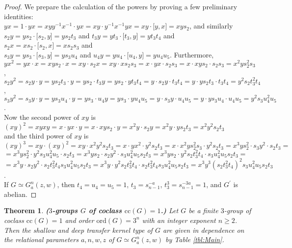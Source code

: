 \documentclass{amsart}
\newtheorem{theorem}{Theorem}[section]
\theoremstyle{definition}
\numberwithin{equation}{section}
\begin{document}
\begin{proof}
We prepare the calculation of the powers by proving a few preliminary identities:\\
\(yx=1\cdot yx=xyy^{-1}x^{-1}\cdot yx=xy\cdot y^{-1}x^{-1}yx=xy\cdot\lbrack y,x\rbrack=xys_2\), and similarly\\
\(s_2y=ys_2\cdot\lbrack s_2,y\rbrack=ys_2t_3\) and
\(t_3y=yt_3\cdot\lbrack t_3,y\rbrack=yt_3t_4\) and
\(s_2x=xs_2\cdot\lbrack s_2,x\rbrack=xs_2s_3\) and\\
\(s_3y=ys_3\cdot\lbrack s_3,y\rbrack=ys_3u_4\) and
\(u_4y=yu_4\cdot\lbrack u_4,y\rbrack=yu_4u_5\). Furthermore,\\
\(yx^2=yx\cdot x=xys_2\cdot x=xy\cdot s_2x=xy\cdot xs_2s_3=x\cdot yx\cdot s_2s_3=x\cdot xys_2\cdot s_2s_3=x^2ys_2^2s_3\),\\
\(s_2y^2=s_2y\cdot y=ys_2t_3\cdot y=ys_2\cdot t_3y=ys_2\cdot yt_3t_4=y\cdot s_2y\cdot t_3t_4=y\cdot ys_2t_3\cdot t_3t_4=y^2s_2t_3^2t_4\),\\
\(s_3y^2=s_3y\cdot y=ys_3u_4\cdot y=ys_3\cdot u_4y=ys_3\cdot yu_4u_5=y\cdot s_3y\cdot u_4u_5=y\cdot ys_3u_4\cdot u_4u_5=y^2s_3u_4^2u_5\).\\
Now the second power of \(xy\) is\\
\((xy)^2=xyxy=x\cdot yx\cdot y=x\cdot xys_2\cdot y=x^2y\cdot s_2y=x^2y\cdot ys_2t_3=x^2y^2s_2t_3\)\\
and the third power of \(xy\) is\\
\((xy)^3=xy\cdot (xy)^2=xy\cdot x^2y^2s_2t_3=x\cdot yx^2\cdot y^2s_2t_3=x\cdot x^2ys_2^2s_3\cdot y^2s_2t_3=x^3ys_2^2\cdot s_3y^2\cdot s_2t_3=\)\\
\(=x^3ys_2^2\cdot y^2s_3u_4^2u_5\cdot s_2t_3=x^3ys_2\cdot s_2y^2\cdot s_3u_4^2u_5s_2t_3=x^3ys_2\cdot y^2s_2t_3^2t_4\cdot s_3u_4^2u_5s_2t_3=\)\\
\(=x^3y\cdot s_2y^2\cdot s_2t_3^2t_4s_3u_4^2u_5s_2t_3=x^3y\cdot y^2s_2t_3^2t_4\cdot s_2t_3^2t_4s_3u_4^2u_5s_2t_3=x^3y^3(s_2t_3^2t_4)^2s_3u_4^2u_5s_2t_3\).\\
If \(G\simeq G_a^n(z,w)\), then \(t_4=u_4=u_5=1\), \(t_3=s_{n-1}^{-a}\), \(t_3^3=s_{n-1}^{-3a}=1\), and \(G^\prime\) is abelian.
\end{proof}


\begin{theorem}
\label{thm:Main}
\textbf{(\(3\)-groups \(G\) of coclass \(\mathrm{cc}(G)=1\).)}
Let \(G\) be a finite \(3\)-group of coclass \(\mathrm{cc}(G)=1\)
and order \(\mathrm{ord}(G)=3^n\) with an integer exponent \(n\ge 2\).
Then the shallow and deep transfer kernel type of \(G\) are given
in dependence on the relational parameters \(a,n,w,z\) of \(G\simeq G_a^n(z,w)\)
by Table
\ref{tbl:Main}.
\end{theorem}
\end{document}
